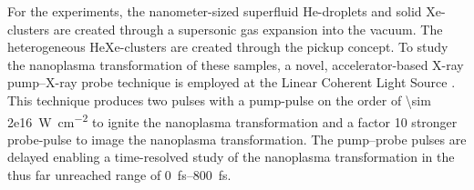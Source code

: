 For the experiments, the nanometer-sized superfluid He-droplets and solid Xe-clusters are created through a supersonic gas expansion into the vacuum. The heterogeneous HeXe-clusters are created through the pickup concept. To study the nanoplasma transformation of these samples, a novel, accelerator-based X-ray pump--X-ray probe technique is employed at the Linear Coherent Light Source \cite{Lutman-2013-PRL}. This technique produces two pulses with a pump-pulse on the order of \SI{\sim 2e16}{\watt\per\square\centi\meter} to ignite the nanoplasma transformation and a factor 10 stronger probe-pulse to image the nanoplasma transformation. The pump--probe pulses are delayed enabling a time-resolved study of the nanoplasma transformation in the thus far unreached range of \SIrange{0}{800}{\femto\second}.\\[1\baselineskip]
%

